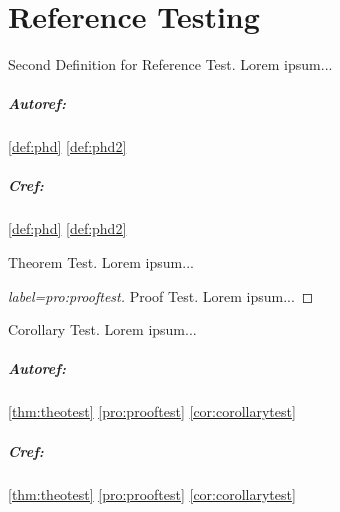 \chapter{Reference Testing}

\begin{definition}[label=def:phd2]{Second Definition for Reference Test.}{}
Lorem ipsum...
\end{definition}

\paragraph{Autoref:} \autoref{def:phd} \autoref{def:phd2}

\paragraph{Cref:} \cref{def:phd} \cref{def:phd2}

\begin{theorem}[label=thm:theotest]{Theorem Test.}{}
	Lorem ipsum...
\end{theorem}

\begin{proof}[label=pro:prooftest]{Proof Test.}{}
	Lorem ipsum...
\end{proof}

\begin{corollary}[label=cor:corollarytest]{Corollary Test.}{}
	Lorem ipsum...
\end{corollary}

\paragraph{Autoref:} \autoref{thm:theotest} \autoref{pro:prooftest} \autoref{cor:corollarytest}

\paragraph{Cref:} \cref{thm:theotest} \cref{pro:prooftest} \cref{cor:corollarytest}
